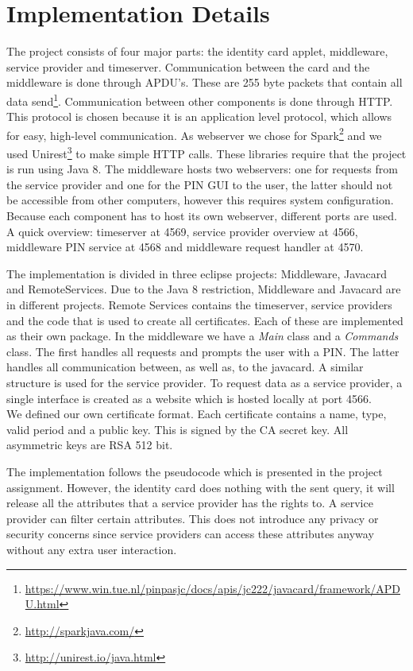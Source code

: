\documentclass[12pt]{report}
\begin{document}
\section{Implementation Details}
The project consists of four major parts: the identity card applet, middleware, service provider and timeserver. Communication between the card and the middleware is done through APDU's. These are 255 byte packets that contain all data send\footnote{\url{https://www.win.tue.nl/pinpasjc/docs/apis/jc222/javacard/framework/APDU.html}}. Communication between other components is done through HTTP. This protocol is chosen because it is an application level protocol, which allows for easy, high-level communication. As webserver we chose for Spark\footnote{\url{http://sparkjava.com/}} and we used Unirest\footnote{\url{http://unirest.io/java.html}} to make simple HTTP calls. These libraries require that the project is run using Java 8. The middleware hosts two webservers: one for requests from the service provider and one for the PIN GUI to the user, the latter should not be accessible from other computers, however this requires system configuration. Because each component has to host its own webserver, different ports are used. A quick overview: timeserver at 4569, service provider overview at 4566, middleware PIN service at 4568 and middleware request handler at 4570.

The implementation is divided in three eclipse projects: Middleware, Javacard and RemoteServices. Due to the Java 8 restriction, Middleware and Javacard are in different projects. Remote Services contains the timeserver, service providers and the code that is used to create all certificates. Each of these are implemented as their own package. In the middleware we have a \emph{Main} class and a \emph{Commands} class. The first handles all requests and prompts the user with a PIN. The latter handles all communication between, as well as, to the javacard. A similar structure is used for the service provider. To request data as a service provider, a single interface is created as a website which is hosted locally at port 4566.\\
We defined our own certificate format. Each certificate contains a name, type, valid period and a public key. This is signed by the CA secret key. All asymmetric keys are RSA 512 bit.

The implementation follows the pseudocode which is presented in the project assignment. However, the identity card does nothing with the sent query, it will release all the attributes that a service provider has the rights to. A service provider can filter certain attributes. This does not introduce any privacy or security concerns since service providers can access these attributes anyway without any extra user interaction.
\end{document}
